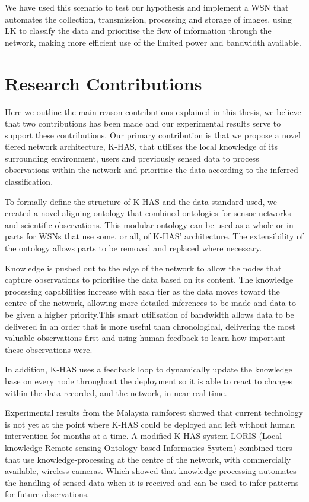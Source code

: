 We have used this scenario to test our hypothesis and implement a WSN that automates the collection, transmission, processing and storage of images, using LK to classify the data and prioritise the flow of information through the network, making more efficient use of the limited power and bandwidth available. 

\section{Research Contributions}

Here we outline the main reason contributions explained in this thesis, we believe that two contributions has been made and our experimental results serve to support these contributions.
Our primary contribution is that we propose a novel tiered network architecture, K-HAS, that utilises the local knowledge of its surrounding environment, users and previously sensed data to process observations within the network and prioritise the data according to the inferred classification. 

To formally define the structure of K-HAS and the data standard used, we created a novel aligning ontology that combined ontologies for sensor networks and scientific observations. This modular ontology can be used as a whole or in parts for WSNs that use some, or all, of K-HAS' architecture. The extensibility of the ontology allows parts to be removed and replaced where necessary.

Knowledge is pushed out to the edge of the network to allow the nodes that capture observations to prioritise the data based on its content. The knowledge processing capabilities increase with each tier as the data moves toward the centre of the network, allowing more detailed inferences to be made and data to be given a higher priority.This smart utilisation of bandwidth allows data to be delivered in an order that is more useful than chronological, delivering the most valuable observations first and using human feedback to learn how important these observations were. 

In addition, K-HAS uses a feedback loop to dynamically update the knowledge base on every node throughout the deployment so it is able to react to changes within the data recorded, and the network, in near real-time.

Experimental results from the Malaysia rainforest showed that current technology is not yet at the point where K-HAS could be deployed and left without human intervention for months at a time. A modified K-HAS system LORIS (Local knowledge Remote-sensing Ontology-based Informatics System) combined tiers that use knowledge-processing at the centre of the network, with commercially available, wireless cameras. Which showed that knowledge-processing automates the handling of sensed data when it is received and can be used to infer patterns for future observations.

